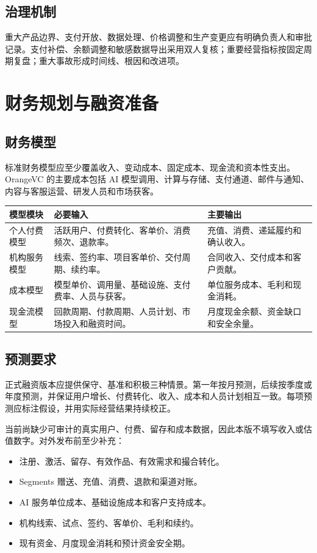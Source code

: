 \documentclass[12pt,a4paper,openany,fontset=fandol]{ctexrep}
\begin{document}
\section{治理机制}

重大产品边界、支付开放、数据处理、价格调整和生产变更应有明确负责人和审批记录。支付补偿、余额调整和敏感数据导出采用双人复核；重要经营指标按固定周期复盘；重大事故形成时间线、根因和改进项。

\chapter{财务规划与融资准备}

\section{财务模型}

标准财务模型应至少覆盖收入、变动成本、固定成本、现金流和资本性支出。OrangeVC 的主要成本包括 AI 模型调用、计算与存储、支付通道、邮件与通知、内容与客服运营、研发人员和市场获客。

\begin{longtable}{p{3.3cm} p{5.1cm} p{5.1cm}}
\toprule
模型模块 & 必要输入 & 主要输出 \\
\midrule
个人付费模型 & 活跃用户、付费转化、客单价、消费频次、退款率。 & 充值、消费、递延履约和确认收入。 \\
机构服务模型 & 线索、签约率、项目客单价、交付周期、续约率。 & 合同收入、交付成本和客户贡献。 \\
成本模型 & 模型单价、调用量、基础设施、支付费率、人员与获客。 & 单位服务成本、毛利和现金消耗。 \\
现金流模型 & 回款周期、付款周期、人员计划、市场投入和融资时间。 & 月度现金余额、资金缺口和安全余量。 \\
\bottomrule
\end{longtable}

\section{预测要求}

正式融资版本应提供保守、基准和积极三种情景。第一年按月预测，后续按季度或年度预测，并保证用户增长、付费转化、收入、成本和人员计划相互一致。每项预测应标注假设，并用实际经营结果持续校正。

当前尚缺少可审计的真实用户、付费、留存和成本数据，因此本版不填写收入或估值数字。对外发布前至少补充：

\begin{itemize}
  \item 注册、激活、留存、有效作品、有效需求和撮合转化。
  \item Segments 赠送、充值、消费、退款和渠道对账。
  \item AI 服务单位成本、基础设施成本和客户支持成本。
  \item 机构线索、试点、签约、客单价、毛利和续约。
  \item 现有资金、月度现金消耗和预计资金安全期。
\end{itemize}
\end{document}

